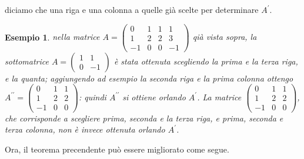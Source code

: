\documentclass{book}
\newtheorem{esempio}{Esempio}
\begin{document}
diciamo che una riga e una colonna a quelle già scelte per determinare $A^\prime$.
\begin{esempio}
  nella matrice $A=
  \begin{pmatrix}
    0 & 1 & 1 & 1 \\
    1 & 2 & 2 & 3 \\
    -1 & 0 & 0 & -1
  \end{pmatrix}
  $ qià vista sopra, la sottomatrice $A=
  \begin{pmatrix}
    1 & 1 \\
    0 & -1
  \end{pmatrix}
  $ è stata ottenuta scegliendo la prima e  la terza riga, e la quanta; aggiungendo ad esempio la seconda riga e
  la prima colonna ottengo $A^{\prime\prime}=
  \begin{pmatrix}
    0 &1 &1\\
    1 & 2& 2\\
    -1 & 0 & 0
  \end{pmatrix}
  $: quindi $A^{\prime\prime}$ si ottiene orlando $A^\prime$. La matrice $
  \begin{pmatrix}
    0 &1&1\\
    1&2&2\\
    -1&0&0
  \end{pmatrix}
  $, che corrisponde a scegliere prima, seconda e la terza riga, e prima, seconda e terza colonna, non è invece
  ottenuta orlando $A^\prime$.
\end{esempio}
Ora, il teorema precendente può essere migliorato come segue.
\end{document}
